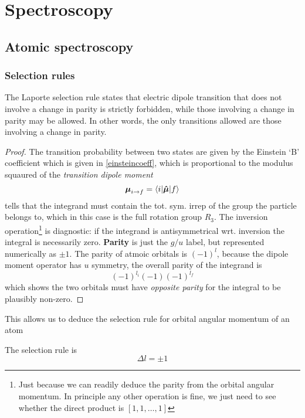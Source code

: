 \chapter{Spectroscopy}
\section{Atomic spectroscopy}
\subsection{Selection rules}
\begin{thrm}
The Laporte selection rule states that electric dipole transition that does not involve a change in parity is strictly forbidden, while those involving a change in parity may be allowed. In other words, the only transitions allowed are those involving a change in parity.
\end{thrm}
\begin{proof}
The transition probability between two states are given by the Einstein `B' coefficient which is given in \cref{einsteincoeff}, which is proportional to the modulus squaured of the \emph{transition dipole moment}
\begin{equation}
	\boldsymbol{\mu}_{i\rightarrow f}=\langle i | \boldsymbol{\hat{\mu}} |f\rangle
\end{equation}
 tells that the integrand must contain the tot. sym. irrep of the group the particle belongs to, which in this case is the full rotation group $R_3$. The inversion operation\footnote{Just because we can readily deduce the parity from the orbital angular momentum. In principle any other operation is fine, we just need to see whether the direct product is $[1,1,\dots,1]$} is diagnostic: if the integrand is antisymmetrical wrt. inversion the integral is necessarily zero. \textbf{Parity} is just the $g/u$ label, but represented numerically as $\pm1$. The parity of atmoic orbitals is $(-1)^l$, because the dipole moment operator has $u$ symmetry, the overall parity of the integrand is
\begin{equation}
	(-1)^{l_i}(-1)(-1)^{l_f}
\end{equation}
which shows the two orbitals must have \emph{opposite parity} for the integral to be plausibly non-zero.
\end{proof}
This allows us to deduce the selection rule for orbital angular momentum of an atom
\begin{thrm}
The selection rule is 
\begin{equation}
	\Delta l=\pm1
\end{equation}
\end{thrm}
